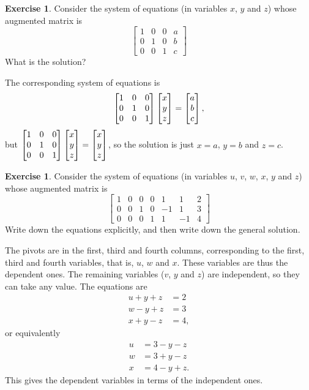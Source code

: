 \documentclass[a4paper]{book}
\theoremstyle{definition}
\newtheorem{exercise}[theorem]{Exercise}
\renewenvironment{solution}{\SolutionInline}{\endSolutionInline}
\begin{document}
\begin{exercise}
Consider the system of equations (in variables $x$, $y$ and $z$) whose
augmented matrix is
 \[ \left[\begin{array}{ccc|c}
   1&0&0&a \\
   0&1&0&b \\
   0&0&1&c
 \end{array}\right] \]
 What is the solution?
\end{exercise}
\begin{solution}
 The corresponding system of equations is 
 \[ \begin{bmatrix} 1&0&0\\0&1&0\\0&0&1\end{bmatrix} \begin{bmatrix} x\\ y\\ z\end{bmatrix} = 
     \begin{bmatrix} a\\ b\\ c\end{bmatrix},
 \]
 but
 $\begin{bmatrix} 1&0&0\\0&1&0\\0&0&1\end{bmatrix}\begin{bmatrix} x\\ y\\ z\end{bmatrix}=\begin{bmatrix} x\\ y\\ z\end{bmatrix}$,
 so the solution is just $x=a$, $y=b$ and $z=c$.
\end{solution}
\begin{exercise}
 Consider the system of equations (in variables $u$, $v$, $w$, $x$,
 $y$ and $z$) whose augmented matrix is 
 \[ \left[\begin{array}{cccccc|c}
   1&0&0&0& 1& 1 & 2 \\
   0&0&1&0&-1& 1 & 3 \\
   0&0&0&1& 1&-1 & 4
 \end{array}\right] \]
 Write down the equations explicitly, and then write down the general
 solution.  
\end{exercise}
\begin{solution}
 The pivots are in the first, third and fourth columns, corresponding
 to the first, third and fourth variables, that is, $u$, $w$ and $x$.
 These variables are thus the dependent ones.  The remaining variables
 ($v$, $y$ and $z$) are independent, so they can take any value.  The
 equations are
 \begin{align*}
  u+y+z &= 2 \\
  w-y+z &= 3 \\
  x+y-z &= 4,
 \end{align*}
 or equivalently
 \begin{align*}
  u &= 3-y-z \\
  w &= 3+y-z \\
  x &= 4-y+z.
 \end{align*}
 This gives the dependent variables in terms of the independent ones.
\end{solution}
\end{document}
